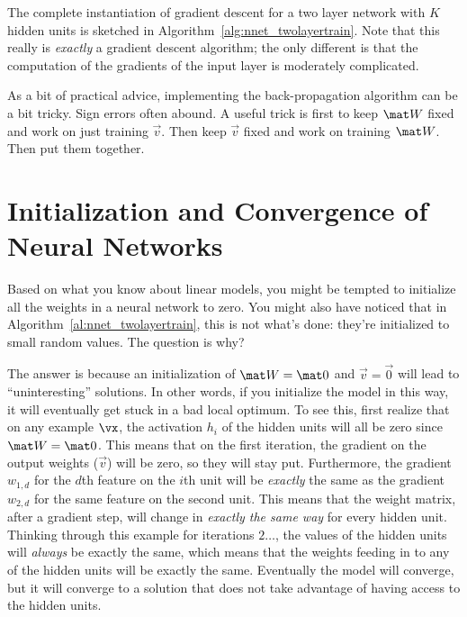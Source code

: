 The complete instantiation of gradient descent for a two layer network
with $K$ hidden units is sketched in
Algorithm~\ref{alg:nnet_twolayertrain}.  Note that this really is
\emph{exactly} a gradient descent algorithm; the only different is
that the computation of the gradients of the input layer is moderately
complicated.


As a bit of practical advice, implementing the back-propagation
algorithm can be a bit tricky.  Sign errors often abound.  A useful
trick is first to keep $\mat W$ fixed and work on just training $\vec
v$.  Then keep $\vec v$ fixed and work on training $\mat W$.  Then put
them together.


\section{Initialization and Convergence of Neural Networks}

Based on what you know about linear models, you might be tempted to
initialize all the weights in a neural network to zero.  You might
also have noticed that in Algorithm~\ref{al:nnet_twolayertrain}, this
is not what's done: they're initialized to small random values.  The
question is why?

The answer is because an initialization of $\mat W = \mat 0$ and $\vec
v = \vec 0$ will lead to ``uninteresting'' solutions.  In other words,
if you initialize the model in this way, it will eventually get stuck
in a bad local optimum.  To see this, first realize that on any
example $\vx$, the activation $h_i$ of the hidden units will all be
zero since $\mat W = \mat 0$.  This means that on the first iteration,
the gradient on the output weights ($\vec v$) will be zero, so they
will stay put.  Furthermore, the gradient $w_{1,d}$ for the $d$th
feature on the $i$th unit will be \emph{exactly} the same as the
gradient $w_{2,d}$ for the same feature on the second unit.  This
means that the weight matrix, after a gradient step, will change in
\emph{exactly the same way} for every hidden unit.  Thinking through
this example for iterations $2\dots$, the values of the hidden units
will \emph{always} be exactly the same, which means that the weights
feeding in to any of the hidden units will be exactly the same.
Eventually the model will converge, but it will converge to a solution
that does not take advantage of having access to the hidden units.

